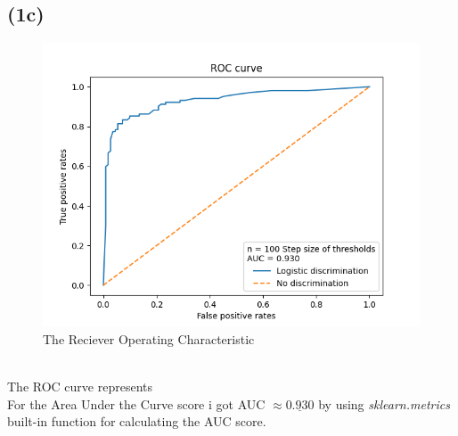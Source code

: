 \documentclass[12pt, letterpaper]{article}
\begin{document}
    \subsection*{(1c)}
      \begin{figure}[H]
        \caption{The Reciever Operating Characteristic}
        \centering
        \includegraphics[width=14cm]{ROC}
      \end{figure}\\
      The ROC curve represents\\

      \noindent For the Area Under the Curve score i got AUC $ \approx \underline{0.930}$ by using \textit{sklearn.metrics} built-in function for calculating the AUC score.
\end{document}
